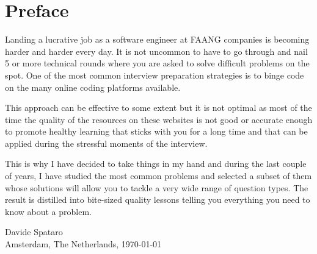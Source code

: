 \chapter*{Preface}

Landing a lucrative job as a software engineer at FAANG companies is becoming harder and harder every day. It is not uncommon to have to go through and nail 5 or more technical rounds where you are asked to solve difficult problems on the spot.
One of the most common interview preparation strategies is to binge code on the many online coding platforms available.

This approach can be effective to some extent but it is not optimal as most of the time the quality of the resources on these websites is not good or accurate enough to promote healthy learning that sticks with you for a long time and that can be applied during the stressful moments of the interview.

This is why I have decided to take things in my hand and during the last couple of years, I have studied the most common problems and selected a subset of them whose solutions will allow you to tackle a very wide range of question types. The result is distilled into bite-sized quality lessons telling you everything you need to know about a problem.


\medskip
\begin {flushright}
  Davide Spataro \hfill \\
  Amsterdam, The Netherlands, \today
\end {flushright}